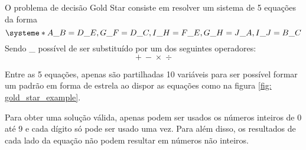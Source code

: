 
O problema de decisão Gold Star consiste em resolver um sistema de 5 equações da forma
\begin{equation}
\systeme*{
A \_ B = D \_ E ,
G \_ F = D \_ C ,
I \_ H = F \_ E ,
G \_ H = J \_ A ,
I \_ J = B \_ C
}
\end{equation}
Sendo \_ possível de ser substituído por um dos seguintes operadores:
\begin{equation}
    +\  -\  \mbox{×}\ \ \mbox{÷}
\end{equation}

Entre as 5 equações, apenas são partilhadas 10 variáveis para ser possível formar um padrão em forma de estrela ao dispor as equações como na figura \ref{fig: gold_star_example}.



Para obter uma solução válida, apenas podem ser usados os números inteiros de 0 até 9 e cada dígito só pode ser usado uma vez. Para além disso, os resultados de cada lado da equação não podem resultar em números não inteiros.